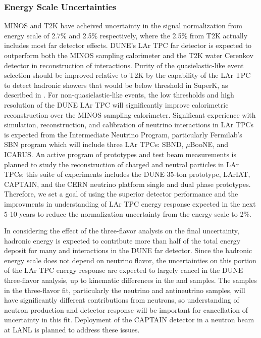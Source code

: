 \subsubsection{\nue Energy Scale Uncertainties}
\label{sec:syst_just_fd}
MINOS and T2K have acheived uncertainty in the \nue signal normalization from \nue energy scale
of 2.7\% and 2.5\% respectively,
where the 2.5\% from T2K actually includes most far detector effects. DUNE's LAr TPC far detector
is expected to outperform both the MINOS sampling calorimeter and the T2K water Cerenkov detector
in reconstruction of \nue interactions. Purity of the quasielastic-like event selection
should be improved relative to T2K by the capability of the LAr TPC to detect hadronic showers
that would be below threshold in SuperK, as described in \cite{UlrichMosel}. For non-quasielastic-like
events, the low thresholds and high resolution of the DUNE LAr TPC will significantly improve
calorimetric reconstruction over the MINOS sampling calorimeter.
Significant experience with simulation, reconstruction, and calibration
of neutrino interactions in LAr TPCs is expected from the Intermediate Neutrino Program, particularly
Fermilab's SBN program which will include three LAr TPCs: SBND, $\mu$BooNE, and ICARUS. An active program of
prototypes and test beam measurements is planned to study the reconstruction of charged and neutral particles
in LAr TPCs; this suite of experiments includes the DUNE 35-ton prototype, LArIAT, CAPTAIN, and
the CERN neutrino platform single and dual phase prototypes.
Therefore, we set a goal of using the superior detector performance and the improvments
in understanding of LAr TPC energy response expected in the next 5-10 years to reduce the normalization uncertainty
from the \nue energy scale to 2\%.

In considering the effect of the three-flavor analysis on the final uncertainty, hadronic energy is expected
to contribute more than half of the total energy deposit for many \nue and \numu interactions in the DUNE
far detector. Since the hadronic energy scale does not depend on neutrino flavor, the uncertainties on this
portion of the LAr TPC energy response are expected to largely cancel in the DUNE three-flavor analysis, up
to kinematic differences in the \nue and \numu samples. The samples in the three-flavor fit, particularly the
neutrino and antineutrino samples, will have significantly different contributions from neutrons, so understanding
of neutron production and detector response will be important for cancellation of uncertainty in this fit.
Deployment of the CAPTAIN detector in a neutron beam at LANL is planned to address these issues.

